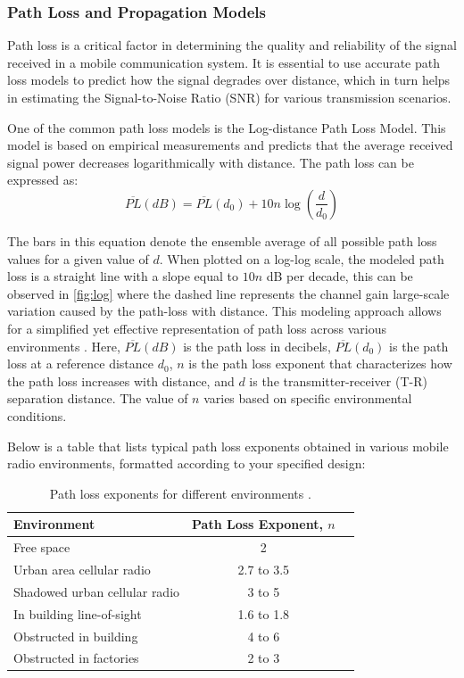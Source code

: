 \subsubsection*{Path Loss and Propagation Models}

Path loss is a critical factor in determining the quality and reliability of the signal received in a mobile communication system. It is essential to use accurate path loss models to predict how the signal degrades over distance, which in turn helps in estimating the Signal-to-Noise Ratio (SNR) for various transmission scenarios.

One of the common path loss models is the Log-distance Path Loss Model. This model is based on empirical measurements and predicts that the average received signal power decreases logarithmically with distance. The path loss can be expressed as:
\begin{equation}
\overline{PL}(dB) = \overline{PL}(d_0) + 10n\log\left(\frac{d}{d_0}\right)
\end{equation}

The bars in this equation denote the ensemble average of all possible path loss values for a given value of \(d\). When plotted on a log-log scale, the modeled path loss is a straight line with a slope equal to \(10n\) dB per decade, this can be observed in \autoref{fig:log} where the dashed line represents the channel gain large-scale variation caused by the path-loss with distance. This modeling approach allows for a simplified yet effective representation of path loss across various environments \cite{rappaport2001wireless}. Here, \( \overline{PL}(dB) \) is the path loss in decibels, \( \overline{PL}(d_0) \) is the path loss at a reference distance \(d_0\), \(n\) is the path loss exponent that characterizes how the path loss increases with distance, and \(d\) is the transmitter-receiver (T-R) separation distance. The value of \(n\) varies based on specific environmental conditions.

Below is a table that lists typical path loss exponents obtained in various mobile radio environments, formatted according to your specified design:

\begin{table}[h]
\centering
\caption{Path loss exponents for different environments \cite{rappaport2001wireless}.}
\label{tab:path_loss_exponents}
\begin{tabular}{@{}lcc@{}}
\toprule
\textbf{Environment} & \textbf{Path Loss Exponent, \(n\)} \\
\midrule
Free space & 2 \\
Urban area cellular radio & 2.7 to 3.5 \\
Shadowed urban cellular radio & 3 to 5 \\
In building line-of-sight & 1.6 to 1.8 \\
Obstructed in building & 4 to 6 \\
Obstructed in factories & 2 to 3 \\
\bottomrule
\end{tabular}
\end{table}
